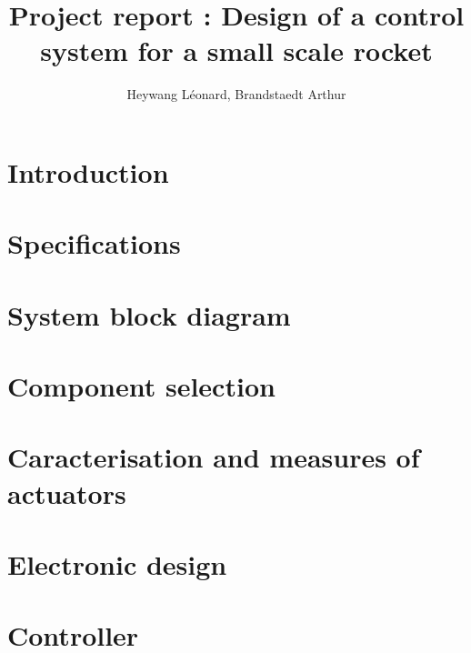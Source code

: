 \documentclass[twoside]{report}
\author{Heywang Léonard, Brandstaedt Arthur}
\title{Project report : Design of a control system for a small scale rocket}
\date{\DTMtoday}
\begin{document}
\fontsize{9}{10.5}





\tableofcontents
\listoffigures
\listoftables

\newpage
\chapter*{Introduction}


\chapter*{Specifications}


\chapter*{System block diagram}

\newpage


\chapter{Component selection}\label{chap:components}


\chapter{Caracterisation and measures of actuators}\label{chap:carac}


% 

\chapter{Electronic design}\label{chap:electronic}


\chapter{Controller}\label{chap:controller}

\end{document}

